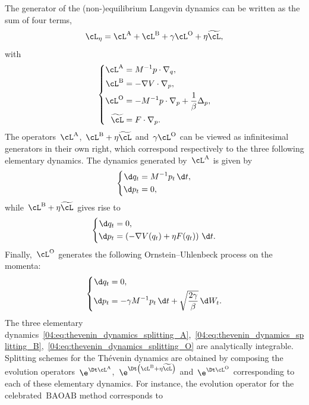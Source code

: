 The generator of the (non-)equilibrium Langevin dynamics can be written as the sum of four terms,
\[\cL_{\eta} = \cL^{\mathrm{A}} + \cL^{\mathrm{B}} +\gamma\cL^{\mathrm{O}} +\eta \widetilde{\cL},\]
with 
\begin{equation}
    \label{04:eq:thevenin_generator_splitting_parts}
    \left\{
    \begin{aligned}
    \cL^{\mathrm{A}}&=M^{-1}p\cdot \nabla_q,\\
    \cL^{\mathrm{B}}&=-\nabla V\cdot \nabla_p,\\
    \cL^{\mathrm{O}}&=-M^{-1}p\cdot \nabla_p +\frac{1}{\beta}\Delta_p,\\
    \widetilde{\cL}&=F\cdot\nabla_p.
    \end{aligned}\right.
\end{equation}
The operators~$\cL^{\mathrm{A}}$,~$\cL^{\mathrm{B}}+\eta\widetilde{\cL}$ and~$\gamma\cL^{\mathrm{O}}$ can be viewed as infinitesimal generators in their own right, which correspond respectively to the three following elementary dynamics. The dynamics generated by~$\cL^{\mathrm{A}}$ is given by
\begin{equation}
\label{04:eq:thevenin_dynamics_splitting_A}
\left\{
\begin{aligned}
    \d q_t &= M^{-1}p_t\,\d t,\\
    \d p_t &= 0,
\end{aligned}\right.
\end{equation}
while~$\cL^{\mathrm{B}} +\eta\widetilde{\cL}$ gives rise to
\begin{equation}
\label{04:eq:thevenin_dynamics_splitting_B}
\left\{
\begin{aligned}
    \d q_t &= 0,\\
    \d p_t &= \left( -\nabla V(q_t) + \eta F(q_t)\right)\,\d t.
\end{aligned}\right.
\end{equation}
Finally,~$\cL^{\mathrm{O}}$ generates the following Ornstein--Uhlenbeck process on the momenta:
\begin{equation} 
    \label{04:eq:thevenin_dynamics_splitting_O}
    \left\{\begin{aligned}
    \d q_t &= 0,\\
    \d p_t &= -\gamma M^{-1}p_t \,\d t +\sqrt{\frac{2\gamma}{\beta}} \,\d W_t.
\end{aligned}\right.
\end{equation}
The three elementary dynamics~\eqref{04:eq:thevenin_dynamics_splitting_A},~\eqref{04:eq:thevenin_dynamics_splitting_B},~\eqref{04:eq:thevenin_dynamics_splitting_O} are analytically integrable. Splitting schemes for the Th\'evenin dynamics  are obtained by composing the evolution operators~$\e^{\Dt \cL^{\mathrm{A}}}$,~$\e^{\Dt \left(\cL^{\mathrm{B}} +\eta \widetilde{\cL}\right)}$ and~$\e^{\Dt \cL^{\mathrm{O}}}$ corresponding to each of these elementary dynamics. For instance, the evolution operator for the celebrated~$\mathrm{BAOAB}$ method corresponds to 
